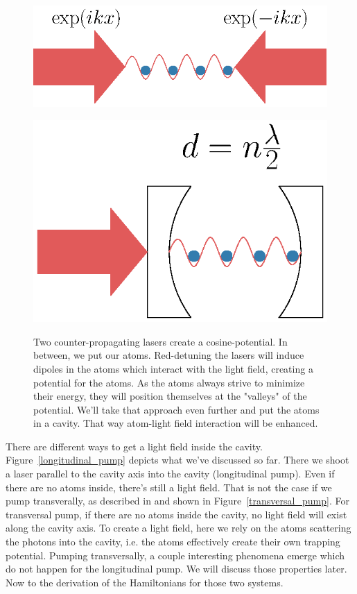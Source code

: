 \begin{figure}[!htb]
	\begin{minipage}[b]{.5\linewidth}
	\centering
	\includegraphics[width=.7\linewidth]{images/counter_propagating.eps}
	\label{counter-propagating}
	\end{minipage}
%
	\begin{minipage}[b]{.5\linewidth}
	\centering
	\includegraphics[width=.7\linewidth]{images/cavity.eps}
	\label{put_in_cavity}
	\end{minipage}
\caption{Two counter-propagating lasers create a cosine-potential. In between, we put our atoms. Red-detuning the lasers will induce dipoles in the atoms which interact with the light field, creating a potential for the atoms. As the atoms always strive to minimize their energy, they will position themselves at the "valleys" of the potential. We'll take that approach even further and put the atoms in a cavity. That way atom-light field interaction will be enhanced.}
\label{laser_cavity}
\end{figure}
\FloatBarrier

\noindent There are different ways to get a light field inside the cavity. Figure~\ref{longitudinal_pump} depicts what we've discussed so far. There we shoot a laser parallel to the cavity axis into the cavity (longitudinal pump). Even if there are no atoms inside, there's still a light field. That is not the case if we pump transverally, as described in \cite{domokos2002} and shown in Figure~\ref{transversal_pump}. For transversal pump, if there are no atoms inside the cavity, no light field will exist along the cavity axis. To create a light field, here we rely on the atoms scattering the photons into the cavity, i.e. the atoms effectively create their own trapping potential. Pumping transversally, a couple interesting phenomena emerge which do not happen for the longitudinal pump. We will discuss those properties later. Now to the derivation of the Hamiltonians for those two systems.

